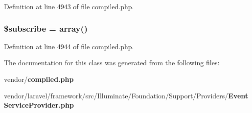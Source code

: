 Definition at line 4943 of file compiled.\+php.

\subsubsection[{\$subscribe}]{\setlength{\rightskip}{0pt plus 5cm}\$subscribe = array()\hspace{0.3cm}{\ttfamily [protected]}}\label{class_illuminate_1_1_foundation_1_1_support_1_1_providers_1_1_event_service_provider_a9a8721814ce811e56d4e0a7ca08fffca}


Definition at line 4944 of file compiled.\+php.



The documentation for this class was generated from the following files\+:\begin{DoxyCompactItemize}
\item 
vendor/{\bf compiled.\+php}\item 
vendor/laravel/framework/src/\+Illuminate/\+Foundation/\+Support/\+Providers/{\bf Event\+Service\+Provider.\+php}\end{DoxyCompactItemize}
